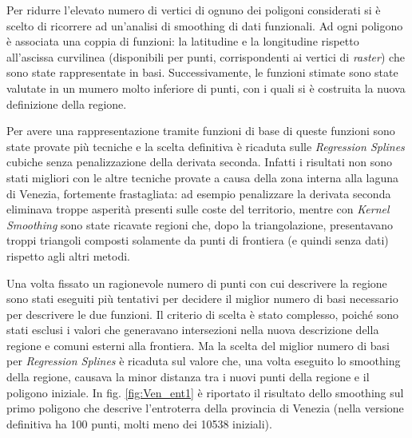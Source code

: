 \documentclass[a4paper,11pt,twoside,openright]{book}							%
\begin{document}
Per ridurre l'elevato numero di vertici di ognuno dei poligoni considerati si è scelto di ricorrere ad un'analisi di smoothing di dati funzionali. Ad ogni poligono è associata una coppia di funzioni: la latitudine e la longitudine rispetto all'ascissa curvilinea (disponibili per punti, corrispondenti ai vertici di \textit{raster}) che sono state rappresentate in basi. Successivamente, le funzioni stimate sono state valutate in un mumero molto inferiore di punti, con i quali si è costruita la nuova definizione della regione.

Per avere una rappresentazione tramite funzioni di base di queste funzioni sono state provate più tecniche e la scelta definitiva è ricaduta sulle \textit{Regression Splines} cubiche senza penalizzazione della derivata seconda. Infatti i risultati non sono stati migliori con le altre tecniche provate a causa della zona interna alla laguna di Venezia, fortemente frastagliata: ad esempio penalizzare la derivata seconda eliminava troppe asperità presenti sulle coste del territorio, mentre con \textit{Kernel Smoothing} sono state ricavate regioni che, dopo la triangolazione, presentavano troppi triangoli composti solamente da punti di frontiera (e quindi senza dati) rispetto agli altri metodi.

Una volta fissato un ragionevole numero di punti con cui descrivere la regione sono stati eseguiti più tentativi per decidere il miglior numero di basi necessario per descrivere le due funzioni. Il criterio di scelta è stato complesso, poiché sono stati esclusi i valori che generavano intersezioni nella nuova descrizione della regione e comuni esterni alla frontiera. Ma la scelta del miglior numero di basi per \textit{Regression Splines} è ricaduta sul valore che, una volta eseguito lo smoothing della regione, causava la minor distanza tra i nuovi punti della regione e il poligono iniziale. In fig. \ref{fig:Ven_ent1} è riportato il risultato dello smoothing sul primo poligono che descrive l'entroterra della provincia di Venezia (nella versione definitiva ha 100 punti, molti meno dei 10538 iniziali).  
\end{document}
